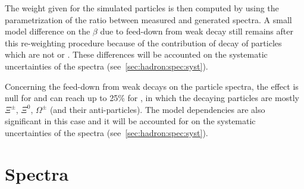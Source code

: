 The weight given for the simulated particles is then
computed by using the parametrization of the ratio between
measured and generated spectra. A small model difference
on the $\beta$ due to feed-down from weak decay still remains
after this re-weighting procedure because of the contribution
of decay of particles which are not \lambs or \kzeros.
These differences will be accounted on the systematic
uncertainties of the spectra (see~\cref{sec:hadron:spec:syst}).

Concerning the feed-down from weak decays on the \vzero particle
spectra, the effect is null for \kzeros and can reach up to 25\%
for \lambs, in which the decaying particles are mostly $\Xi^{\pm}$, $\Xi^0$,
$\Omega^\pm$ (and their anti-particles). The model dependencies are also
significant in this case and it will be accounted for
on the systematic uncertainties of the spectra (see~\cref{sec:hadron:spec:syst}).


\section{Spectra}
\label{sec:hadron:spec}

